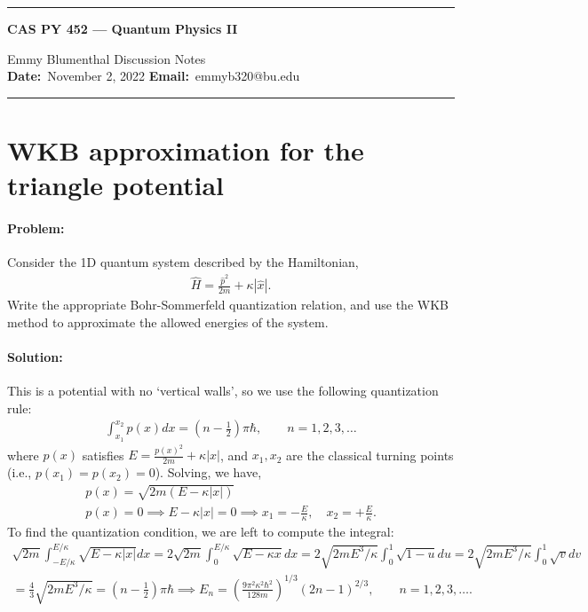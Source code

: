 \documentclass[10pt]{article}
\newcommand{\1}{\mathbf 1}
\begin{document}
\begin{center}
	\hrule
	\vspace{.4cm}
	{\textbf { \large CAS PY 452 --- Quantum Physics II}}
\end{center}
Emmy Blumenthal \hspace{\fill} \hspace{\fill}  \textbf{} Discussion Notes\  \\
\textbf{Date:}\  November 2, 2022   \hspace{\fill} \textbf{Email:}\ emmyb320@bu.edu

\vspace{.4cm}
\hrule

\section*{WKB approximation for the triangle potential}


\paragraph{Problem:}

Consider the 1D quantum system described by the Hamiltonian,
\begin{align}
	\hat H =
	\frac{\hat p^2}{2m}
	+
	\kappa |\hat x|.
\end{align}
Write the appropriate Bohr-Sommerfeld quantization relation, and use the WKB method to approximate the allowed energies of the system.

\paragraph{Solution:}

This is a potential with no `vertical walls', so we use the following quantization rule:
\begin{align}
	\int_{x_1}^{x_2} p(x) dx = \left(n - \frac{1}{2}\right) \pi \hbar,
	\qquad
	n = 1,2,3,\dots
\end{align}
where $p(x)$ satisfies $E = \frac{p(x)^2}{2m}+ \kappa |x|$, and $x_1,x_2$ are the classical turning points (i.e., $p(x_1) = p(x_2) =0$).
Solving, we have,
\begin{gather}
	p(x) = \sqrt{2m(E - \kappa|x|)}\\
	p(x) = 0
	\implies
	E - \kappa|x| = 0 
	\implies
	x_1 = -\frac{E}{\kappa},
	\quad x_2 = + \frac{E}{\kappa}.
\end{gather}
To find the quantization condition, we are left to compute the integral:
\begin{gather}
	\sqrt{2m}
	\int_{-E/\kappa}^{E/\kappa}
	\sqrt{E - \kappa|x|}
	dx
	=
	2
	\sqrt{2m}
	\int_{0}^{E/\kappa}
	\sqrt{E - \kappa x}
	dx
	=
	2
	\sqrt{2mE^3/\kappa}
	\int_0^{1}
	\sqrt{1 - u} 
	du
	=
	2
	\sqrt{2mE^3/\kappa}
	\int_0^{1}
	\sqrt{v}  
	dv
	\nonumber
	\\
	=
	\frac{4}{3}\sqrt{2mE^3/\kappa}
	=
	\left(n-\frac{1}{2}\right)\pi\hbar
	\implies
	E_n
	=
	\left(
		\frac{9 \pi^2 \kappa^2\hbar^2}{128 m}
	\right)^{1/3}
	(2n-1)^{2/3}
	,\qquad
	n=1,2,3,\dots.
\end{gather}
\end{document}
